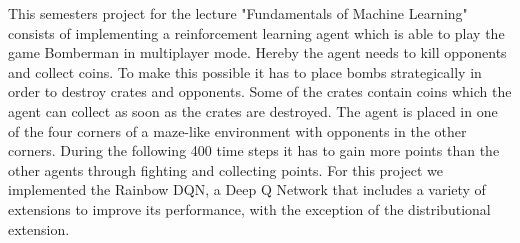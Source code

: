 This semesters project for the lecture "Fundamentals of Machine Learning" consists of implementing a reinforcement learning agent which is able to play the game Bomberman in multiplayer mode.
Hereby the agent needs to kill opponents and collect coins. To make this possible it has to place bombs strategically in order to destroy crates and opponents. Some of the crates contain coins which the agent can collect as soon as the crates are destroyed.
The agent is placed in one of the four corners of a maze-like environment with opponents in the other corners.
During the following 400 time steps it has to gain more points than the other agents through fighting and collecting points.
For this project we implemented the Rainbow DQN\cite{Hessel2018RainbowCI}, a Deep Q Network that includes a variety of extensions to improve its performance, with the exception of the distributional extension.
